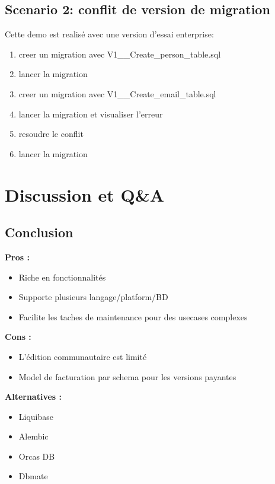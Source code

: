 \documentclass[slidestop,compress,11pt,xcolor=dvipsnames,french]{beamer}
\begin{document}
\subsection*{Scenario 2: conflit de version de migration}
\begin{frame}
Cette demo est realisé avec une version d'essai enterprise: 
\begin{enumerate}
 \item creer un migration avec V1\_\_Create\_person\_table.sql 
 \item lancer la migration
 \item creer un migration avec V1\_\_Create\_email\_table.sql
 \item lancer la migration et visualiser l'erreur
 \item resoudre le conflit
 \item lancer la migration
\end{enumerate}
\end{frame}

\section[Discussion]{Discussion et Q\&A}
\subsection*{Conclusion }
\begin{frame}
\textbf {Pros : \\}
\begin{itemize}
 \item Riche en fonctionnalités 
 \item Supporte plusieurs langage/platform/BD
 \item Facilite les taches de maintenance pour des usecases complexes
\end{itemize}
\textbf {Cons : \\}
\begin{itemize}
 \item L'édition communautaire est limité 
 \item Model de facturation par schema pour les versions payantes
\end{itemize}
\textbf {Alternatives : \\}
\begin{itemize}
 \item Liquibase 
 \item Alembic
 \item Orcas DB
 \item Dbmate
\end{itemize}
\end{frame}
\end{document}
